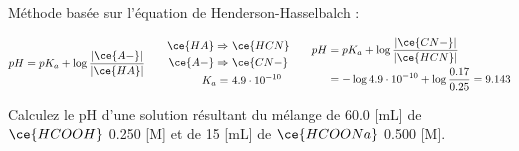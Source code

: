 \documentclass[
  11pt,
  french,
  a4paper,
  openany]{book}
\begin{document}
\begin{Answer}
Méthode basée sur l'équation de Henderson-Hasselbalch :

\[
\begin{split}
  pH = pK_a + \log \frac{|\ce{A-}|}{|\ce{HA}|}
\end{split}
\qquad
\begin{split}
  \ce{HA} \Rightarrow &\ \ce{HCN} \\
  \ce{A-} \Rightarrow &\ \ce{CN-} \\
  K_a = &\ 4.9 \cdot 10^{-10}
\end{split}
\qquad
\begin{split}
  pH &= pK_a + \log \frac{|\ce{CN-}|}{|\ce{HCN}|} \\
  &= - \log 4.9 \cdot 10^{-10} + \log \frac{0.17}{0.25} = 9.143 \\
\end{split}
\]

\end{Answer}

\begin{Exercise}
Calculez le pH d'une solution résultant du mélange de 60.0 {[}mL{]} de \(\ce{HCOOH}\) 0.250 {[}M{]} et de 15 {[}mL{]} de \(\ce{HCOONa}\) 0.500 {[}M{]}.

\end{Exercise}
\end{document}
